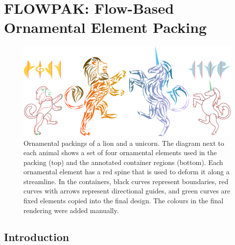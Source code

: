 \chapter
{FLOWPAK: Flow-Based Ornamental Element Packing}
\label{chapter_flowpak}



\begin{figure}[h!]
\centering
\includegraphics[width=1.0\textwidth]{figures/flowpak/lion_unicorn.pdf} 
\caption[Packings of lion and unicorn]
{\label{fig_lion_unicorn} 
Ornamental packings of a lion and a unicorn.
The diagram next to each animal shows a set of four ornamental
elements used in the packing (top) and the annotated
container regions (bottom).  Each ornamental element has a
red spine that is used to deform it along a streamline.  In
the containers, black curves represent boundaries, red
curves with arrows represent directional guides, and green
curves are fixed elements copied into the final design.
The colours in the final rendering were added manually. }
\end{figure}




\section{Introduction}
\label{flowpak_introduction}





